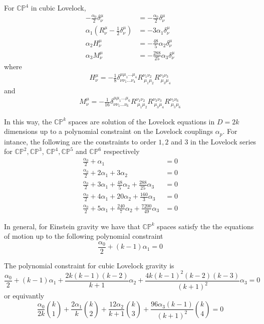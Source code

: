 For $\mathbb{CP}^4$ in cubic Lovelock,
\begin{align*}
    -\frac{\alpha_0}{2}\delta^\mu_\nu&=-\frac{\alpha_0}{2}\delta^\mu_\nu\\
    \alpha_1\left(R^\mu_\nu-\frac{1}{2}\delta^\mu_\nu\right)&=-3\alpha_1\delta^\mu_\nu\\
    \alpha_2 H^\mu_\nu&=-\frac{48}{5}\alpha_2\delta^\mu_\nu\\
    \alpha_3M^\mu_\nu&=-\frac{288}{25}\alpha_3\delta^\mu_\nu
\end{align*}
where
\begin{align*}
    H^\mu_\nu=-\frac{1}{8}\delta^{\mu\mu_1...\mu_4}_{\nu\nu_1...\nu_4}R^{\nu_1\nu_2}_{\  \mu_1\mu_2}R^{\nu_3\nu_3}_{\  \mu_3\mu_4}
\end{align*}
and
\begin{align*}
    M^\mu_\nu=-\frac{1}{16}\delta^{\mu\mu_1...\mu_6}_{\nu\nu_1...\nu_6}R^{\nu_1\nu_2}_{\  \mu_1\mu_2}R^{\nu_3\nu_3}_{\  \mu_3\mu_4}R^{\nu_5\nu_6}_{\  \mu_5\mu_6}
\end{align*}

In this way, the $\mathbb{CP}^k$ spaces are solution of the Lovelock equations in $D=2k$ dimensions up to a polynomial constraint on the Lovelock couplings $\alpha_p$. For intance, the following are the constraints to order $1,2$ and $3$ in the Lovelock series for $\mathbb{CP}^2,\mathbb{CP}^3$, $\mathbb{CP}^4,\mathbb{CP}^5$ and $\mathbb{CP}^6$ respectively
\begin{align*}
    \frac{\alpha_0}{2}+\alpha_1&=0\\
    \frac{\alpha_0}{2}+2\alpha_1+3\alpha_2&=0\\
    \frac{\alpha_0}{2}+3\alpha_1+\frac{48}{5}\alpha_2+\frac{288}{25}\alpha_3&=0\\
    \frac{\alpha_0}{2}+4\alpha_1+20\alpha_2+\frac{160}{3}\alpha_3&=0\\
    \frac{\alpha_0}{2}+5\alpha_1+\frac{240}{7}\alpha_2+\frac{7200}{49}\alpha_3&=0
\end{align*}

In general, for Einstein gravity we have that $\mathbb{CP}^k$ spaces satisfy the the equations of motion up to the following polynomial constraint
\begin{equation*}
    \frac{\alpha_0}{2}+(k-1)\alpha_1=0
\end{equation*}

The polynomial constraint for cubic Lovelock gravity is
\begin{equation*}
    \frac{\alpha_0}{2}+(k-1)\alpha_1+\frac{2k(k-1)(k-2)}{k+1}\alpha_2+\frac{4k(k-1)^2(k-2)(k-3)}{(k+1)^2}\alpha_3=0
\end{equation*}
or equivantly
\begin{equation*}
    \frac{\alpha_0}{2k}\binom{k}{1}+\frac{2\alpha_1}{k}\binom{k}{2}+\frac{12\alpha_2}{k+1}\binom{k}{3}+\frac{96\alpha_3(k-1)}{(k+1)^2}\binom{k}{4}=0
\end{equation*}

